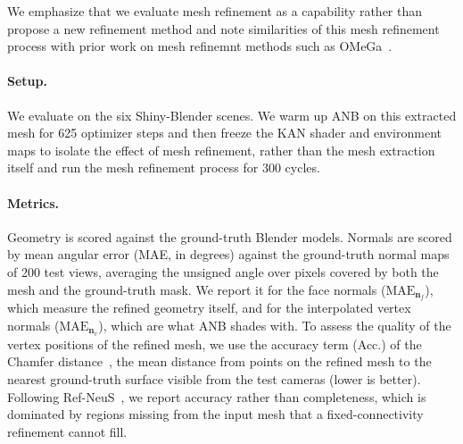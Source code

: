 We emphasize that we evaluate mesh refinement as a capability rather than propose a new refinement method and note similarities of this mesh refinement process with prior work on mesh refinemnt methods such as OMeGa~\citep{omega}. 



\paragraph{Setup.} We evaluate on the six Shiny-Blender scenes.  We warm up ANB
on this extracted mesh for 625 optimizer steps and then freeze the KAN shader and environment maps to isolate the effect of mesh refinement, rather than the mesh extraction itself and run the mesh refinement process for 300 cycles.



\paragraph{Metrics.} Geometry is scored against the ground-truth Blender models. Normals are
scored by mean angular error (MAE, in degrees) against the ground-truth normal maps of 200 test
views, averaging the unsigned angle over pixels covered by both the mesh and the ground-truth mask.
We report it for the face normals ($\mathrm{MAE}_{\mathbf{n}_f}$), which measure the refined
geometry itself, and for the interpolated vertex normals ($\mathrm{MAE}_{\mathbf{n}_v}$), which are
what ANB shades with. To assess the quality of the vertex
positions of the refined mesh, we use the accuracy term (Acc.) of the Chamfer distance~\citep{dtu}, the mean
distance from points on the refined mesh to the nearest ground-truth surface visible from the test
cameras (lower is better). Following Ref-NeuS~\citep{ref-neus}, we report accuracy rather than
completeness, which is dominated by regions missing from the input mesh that a fixed-connectivity
refinement cannot fill.

